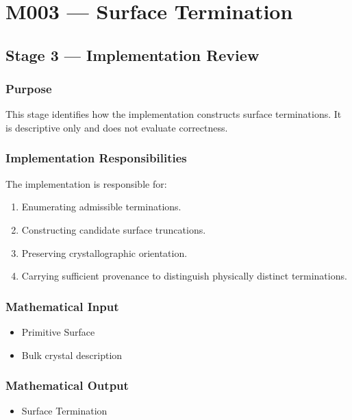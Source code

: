 
\chapter{M003 --- Surface Termination}

\section{Stage 3 --- Implementation Review}

\subsection{Purpose}

This stage identifies how the implementation constructs surface
terminations. It is descriptive only and does not evaluate correctness.

\subsection{Implementation Responsibilities}

The implementation is responsible for:

\begin{enumerate}
\item Enumerating admissible terminations.
\item Constructing candidate surface truncations.
\item Preserving crystallographic orientation.
\item Carrying sufficient provenance to distinguish physically distinct
terminations.
\end{enumerate}

\subsection{Mathematical Input}

\begin{itemize}
\item Primitive Surface
\item Bulk crystal description
\end{itemize}

\subsection{Mathematical Output}

\begin{itemize}
\item Surface Termination
\end{itemize}

